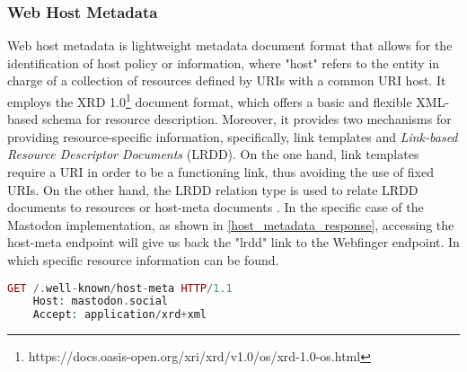 


\subsubsection{Web Host Metadata}
    Web host metadata is lightweight metadata document format that allows for the identification of host policy or information, where "host" refers to the entity in charge of a collection of resources defined by URIs with a common URI host. It employs the XRD 1.0\footnote{https://docs.oasis-open.org/xri/xrd/v1.0/os/xrd-1.0-os.html} document format, which offers a basic and flexible XML-based schema for resource description. Moreover,  it provides two mechanisms for providing resource-specific information, specifically,  link templates and \emph{Link-based Resource Descriptor Documents} (LRDD). On the one hand, link templates require a URI in order to be a functioning link, thus avoiding the use of fixed URIs. On the other hand, the LRDD relation type is used to relate LRDD documents to resources or host-meta documents \cite{cook_2011}. In the specific case of the Mastodon implementation, as shown in \ref{host_metadata_response}, accessing the host-meta endpoint will give us back the "lrdd" link to the Webfinger endpoint. In which specific resource information can be found. 

\lstset{style=JSONStyle}
\begin{lstlisting}[language=PHP, caption=Host Medata request, label="Host Metadata request]
    GET /.well-known/host-meta HTTP/1.1
    Host: mastodon.social
    Accept: application/xrd+xml
\end{lstlisting}

